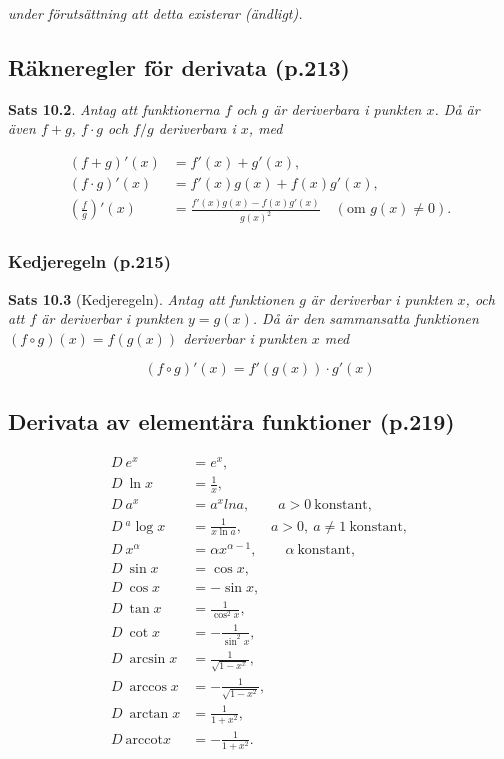\documentclass[11pt]{article}
\begin{document}
\textit{under förutsättning att detta existerar (ändligt).}

\subsection{Räkneregler för derivata (p.213)}

\textbf{Sats 10.2}. \textit{Antag att funktionerna $f$ och $g$ är deriverbara i punkten $x$. Då är även $f+g$, $f \cdot g$ och $f/g$ deriverbara i $x$, med}

\begin{align}
    (f + g)'(x) &= f'(x) + g'(x),\\
    (f \cdot g)'(x) &= f'(x)g(x) + f(x)g'(x),\\
    \left(\frac{f}{g}\right)'(x) &= \frac{f'(x)g(x) - f(x)g'(x)}{g(x)^2} \quad (\text{om } g(x) \neq 0).
\end{align}

\subsubsection{Kedjeregeln (p.215)}

\textbf{Sats 10.3} (Kedjeregeln). \textit{Antag att funktionen $g$ är deriverbar i punkten $x$, och att $f$ är deriverbar i punkten $y = g(x)$. Då är den sammansatta funktionen $(f \circ g)(x) = f(g(x))$ deriverbar i punkten $x$ med}

\begin{equation}
    (f \circ g)'(x) = f'(g(x)) \cdot g'(x)
\end{equation}

\newpage
\subsection{Derivata av elementära funktioner (p.219)}

\begin{align}
    D\ e^x &= e^x,\\
    D\ \ln x &= \frac{1}{x},\\
    D\ a^x &= a^x ln a, \qquad a > 0\ \mathrm{konstant},\\
    D\ {}^{a}\log x &= \frac{1}{x \ln a}, \qquad a > 0,\ a \neq 1\ \mathrm{konstant},\\
    D\ x^\alpha &= \alpha x^{\alpha - 1}, \qquad \alpha\ \mathrm{konstant},\\
    D\ \sin x &= \cos x,\\
    D\ \cos x &= -\sin x,\\
    D\ \tan x &= \frac{1}{\cos^2 x},\\
    D\ \cot x &= -\frac{1}{\sin^2 x},\\
    D\ \arcsin x &= \frac{1}{\sqrt{1 - x^x}},\\
    D\ \arccos x &= -\frac{1}{\sqrt{1 - x^2}},\\
    D\ \arctan x &= \frac{1}{1 + x^2},\\
    D\ \mathrm{arccot} x &= -\frac{1}{1 + x^2}.
\end{align}
\end{document}
